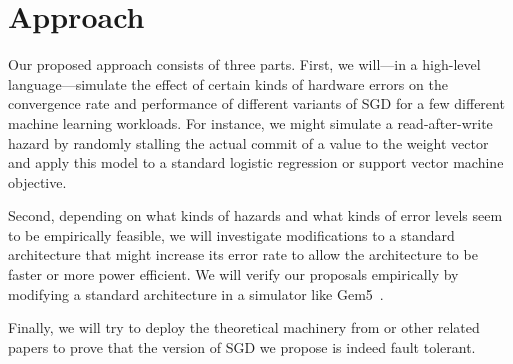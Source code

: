 \documentclass[12pt,leqno,twoside]{article}
\begin{document}
\section{Approach}

Our proposed approach consists of three parts.  First, we will---in
a high-level language---simulate the effect of certain kinds of
hardware errors on the convergence rate and performance of different
variants of SGD for a few different machine learning workloads. For
instance, we might simulate a read-after-write hazard by randomly
stalling the actual commit of a value to the weight vector and
apply this model to a standard logistic regression or support vector
machine objective.

Second, depending on what kinds of hazards and what kinds of error
levels seem to be empirically feasible, we will investigate
modifications to a standard architecture that might increase its
error rate to allow the architecture to be faster or more power
efficient. We will verify our proposals empirically by modifying a
standard architecture in a simulator like Gem5~\citep{gem5}.

Finally, we will try to deploy the theoretical machinery from
\citet{niu11hogwild} or other related papers to prove that the
version of SGD we propose is indeed fault tolerant.


 
\end{document}
